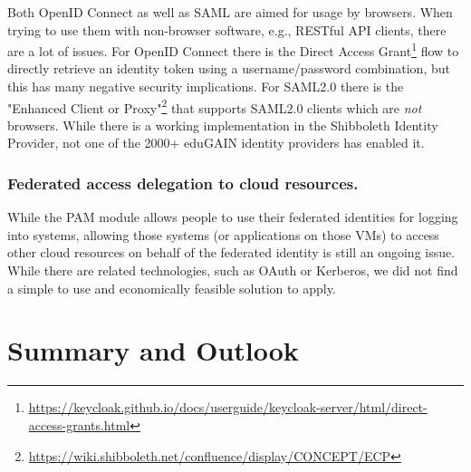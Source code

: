 \documentclass{llncs}
\begin{document}
Both OpenID Connect as well as SAML are aimed for usage by browsers. When trying to use them with non-browser software, e.g., RESTful API clients, there are a lot of issues. For OpenID Connect there is the Direct Access Grant\footnote{\url{https://keycloak.github.io/docs/userguide/keycloak-server/html/direct-access-grants.html}} flow to directly retrieve an identity token using a username/password combination, but this has many negative security implications. For SAML2.0 there is the "Enhanced Client or Proxy"\footnote{\url{https://wiki.shibboleth.net/confluence/display/CONCEPT/ECP}} that supports SAML2.0 clients which are \textit{not} browsers. While there is a working implementation in the Shibboleth Identity Provider, not one of the 2000+ eduGAIN identity providers has enabled it.

\subsubsection{Federated access delegation to cloud resources.} While the PAM module allows people to use their federated identities for logging into systems, allowing those systems (or applications on those VMs) to access other cloud resources on behalf of the federated identity is still an ongoing issue. While there are related technologies, such as OAuth or Kerberos, we did not find a simple to use and economically feasible solution to apply.

\section{Summary and Outlook}
\label{sec:summary}



\end{document}
